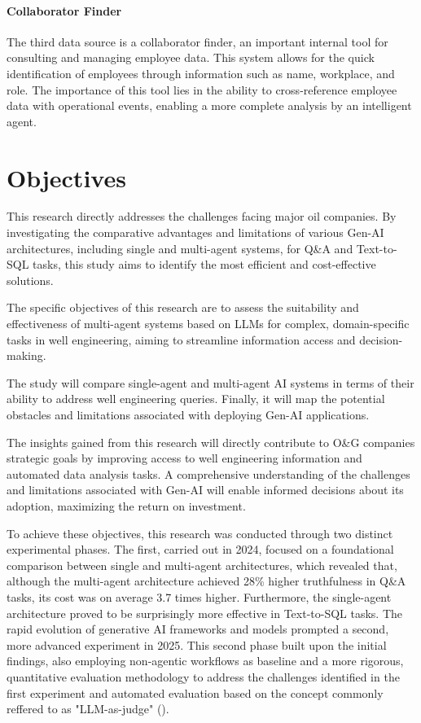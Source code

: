         \paragraph{Collaborator Finder} The third data source is a collaborator finder, an important internal tool for consulting and managing employee data. This system allows for the quick identification of employees through information such as name, workplace, and role. The importance of this tool lies in the ability to cross-reference employee data with operational events, enabling a more complete analysis by an intelligent agent.

\section{Objectives}

    This research directly addresses the challenges facing major oil companies. 
    By investigating the comparative advantages and limitations of various Gen-AI architectures, including single and multi-agent systems, for Q\&A and Text-to-SQL tasks, this study aims to identify the most efficient and cost-effective solutions.
    
    The specific objectives of this research are to assess the suitability and effectiveness of multi-agent systems based on LLMs for complex, domain-specific tasks in well engineering, aiming to streamline information access and decision-making.
    
    The study will compare single-agent and multi-agent AI systems in terms of their ability to address well engineering queries. Finally, it will map the potential obstacles and limitations associated with deploying Gen-AI applications.
            
    The insights gained from this research will directly contribute to O\&G companies strategic goals by improving access to well engineering information and automated data analysis tasks. 
    A comprehensive understanding of the challenges and limitations associated with Gen-AI will enable informed decisions about its adoption, maximizing the return on investment. 

    To achieve these objectives, this research was conducted through two distinct experimental phases. The first, carried out in 2024, focused on a foundational comparison between single and multi-agent architectures, which revealed that, although the multi-agent architecture achieved 28\% higher truthfulness in Q\&A tasks, its cost was on average 3.7 times higher. Furthermore, the single-agent architecture proved to be surprisingly more effective in Text-to-SQL tasks. The rapid evolution of generative AI frameworks and models prompted a second, more advanced experiment in 2025. This second phase built upon the initial findings, also employing non-agentic workflows as baseline and a more rigorous, quantitative evaluation methodology to address the challenges identified in the first experiment and automated evaluation based on the concept commonly reffered to as "LLM-as-judge" (\citep{Gu2025}).
    

